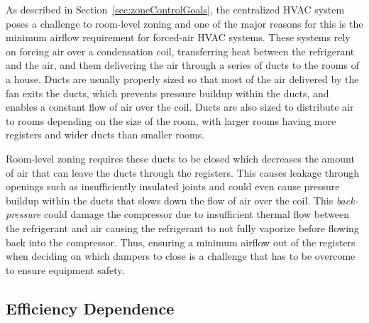 As described in Section~\ref{sec:zoneControlGoals}, the centralized HVAC system
poses a challenge to room-level zoning and one of the major reasons for this is
the minimum airflow requirement for forced-air HVAC systems. These systems rely
on forcing air over a condensation coil, transferring heat between the
refrigerant and the air, and them delivering the air through a series of ducts
to the rooms of a house. Ducts are usually properly sized so that most of the
air delivered by the fan exits the ducts, which prevents pressure buildup within
the ducts, and enables a constant flow of air over the coil. Ducts are also
sized to distribute air to rooms depending on the size of the room, with larger
rooms having more registers and wider ducts than smaller rooms. 

Room-level zoning requires these ducts to be closed which decreases the amount
of air that can leave the ducts through the registers. This causes leakage
through openings such as insufficiently insulated joints and could even cause
pressure buildup within the ducts that slows down the flow of air over the
coil. This {\em back-pressure} could damage the compressor due to insufficient
thermal flow between the refrigerant and air causing the refrigerant to not
fully vaporize before flowing back into the compressor. Thus, ensuring a minimum
airflow out of the registers when deciding on which dampers to close is a
challenge that has to be overcome to ensure equipment safety.


\subsection{Efficiency Dependence}
\label{sec:efficiencyDependence}

\begin{figure}[t]
\end{figure}

